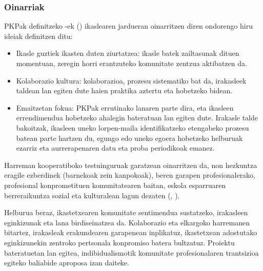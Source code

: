\subsubsection{Oinarriak}\label{subsubsec:pkp_oinarri}
PKPak definitzeko \citeauthor{dufour2004whatever}-ek (\citeyear{dufour2004whatever}) ikaslearen jardueran oinarritzen diren ondorengo hiru ideiak definitzen ditu:

\begin{itemize}
    \item Ikasle guztiek ikasten duten ziurtatzea: ikasle batek zailtasunak dituen momentuan, zeregin horri erantzuteko komunitate zentzua aktibatzen da.
    \item Kolaborazio kultura: kolaborazioa, prozesu sistematiko bat da, irakasleek taldean lan egiten dute haien praktika aztertu eta hobetzeko bidean.
    \item Emaitzetan fokua: PKPak errutinako lanaren parte dira, eta ikasleen errendimendua hobetzeko ahalegin bateratuan lan egiten dute. Irakasle talde bakoitzak, ikasleen uneko lorpen-maila identifikatzeko etengabeko prozesu batean parte hartzen du, egungo edo uneko egoera hobetzeko helburuak ezarriz eta aurrerapenaren datu eta proba periodikoak emanez.
\end{itemize}

Harreman kooperatiboko testuinguruak garatzean oinarritzen da, non hezkuntza eragile ezberdinek (barnekoak zein kanpokoak), beren garapen profesionalerako, profesional konprometituen komunitatearen baitan, eskola esparruaren berreraikuntza sozial eta kulturalean lagun dezaten (\citeauthor{bolivar2012melhorar}, \citeyear{bolivar2012melhorar}). 

Helburua beraz, ikastetxearen komunitate sentimendua sustatzeko, irakasleen eginkizunak eta lana birdiseinatzea da. Kolaborazio eta elkargoko harremanen bitartez, irakasleak erakundearen garapenean inplikatuz, ikastetxean adostutako eginkizunekin zentroko pertsonala konpromiso batera bultzatuz. Proiektu bateratuetan lan egitea, indibidualismotik komunitate profesionalaren trantsizioa egiteko baliabide aproposa izan daiteke.